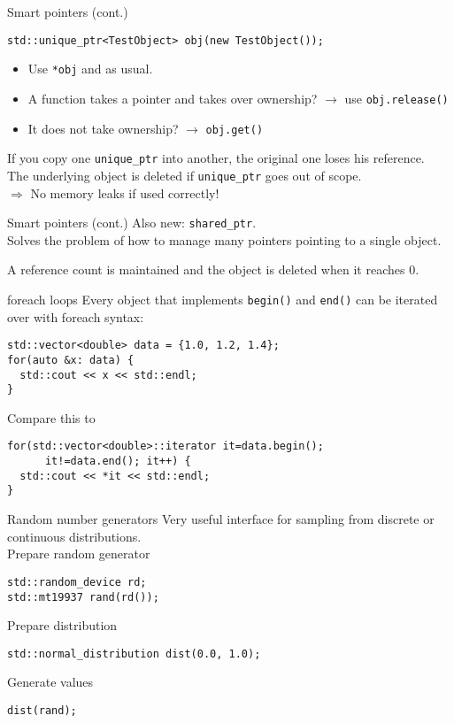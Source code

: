 \documentclass[compress,aspectratio=43]{beamer}
\begin{document}
\begin{frame}[fragile]{Smart pointers (cont.)}
  \begin{verbatim}
std::unique_ptr<TestObject> obj(new TestObject());
  \end{verbatim}
  \begin{itemize}
    \item Use \texttt{*obj} and  as usual.
    \item A function takes a pointer and takes over ownership? $\rightarrow$ use \texttt{obj.release()}
    \item It does not take ownership? $\rightarrow$ \texttt{obj.get()}
  \end{itemize}
  If you copy one \texttt{unique\_ptr} into another, the original one loses his reference. \\
  The underlying object is deleted if \texttt{unique\_ptr} goes out of scope. \\
  $\Rightarrow$ No memory leaks if used correctly!
\end{frame}

\begin{frame}{Smart pointers (cont.)}
  Also new: \texttt{shared\_ptr}. \\
  Solves the problem of how to manage many pointers pointing to a single object.

  A reference count is maintained and the object is deleted when it reaches 0.
\end{frame}

\begin{frame}[fragile]{foreach loops}
  Every object that implements \texttt{begin()} and \texttt{end()} can be iterated over with foreach syntax:
  \begin{verbatim}
std::vector<double> data = {1.0, 1.2, 1.4};
for(auto &x: data) {
  std::cout << x << std::endl;
}
  \end{verbatim}
  Compare this to
  \begin{verbatim}
for(std::vector<double>::iterator it=data.begin();
      it!=data.end(); it++) {
  std::cout << *it << std::endl;
}
  \end{verbatim}
\end{frame}

\begin{frame}[fragile]{Random number generators}
  Very useful interface for sampling from discrete or continuous distributions.\\
  Prepare random generator
  \begin{verbatim}
std::random_device rd;
std::mt19937 rand(rd());
  \end{verbatim}
  Prepare distribution
  \begin{verbatim}
std::normal_distribution dist(0.0, 1.0);
  \end{verbatim}
  Generate values
  \begin{verbatim}
dist(rand);
  \end{verbatim}
\end{frame}
\end{document}
